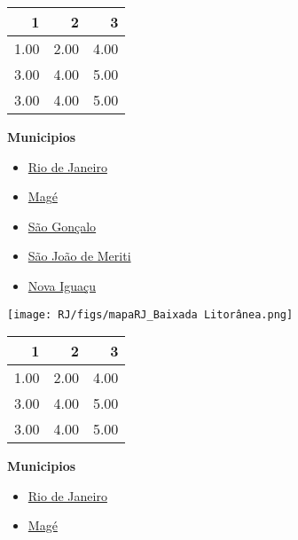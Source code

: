 \documentclass[10pt]{article} %
\begin{document}
\begin{minipage}[t]{.66\linewidth}
\begin{center}
\begin{tabular}{rrr}
  \hline
1 & 2 & 3 \\ 
  \hline
1.00 & 2.00 & 4.00 \\ 
  3.00 & 4.00 & 5.00 \\ 
  3.00 & 4.00 & 5.00 \\ 
   \hline
\end{tabular}
\end{center}
\end{minipage}\hfill\begin{minipage}[t]{.30\linewidth}
\begin{mdframed}[style=sidebar,frametitle={}]
\textbf{Municipios}\begin{itemize}\item \hyperlink{Rio}{Rio de Janeiro}
\item \hyperlink{Mag}{Magé}
\item \hyperlink{SGoncalo}{São Gonçalo}
\item \hyperlink{SJMeriti}{São João de Meriti}
\item \hyperlink{Niguacu}{Nova Iguaçu}
\end{itemize}\end{mdframed}\hfill\end{minipage}\newpage\begin{minipage}[t]{.66\linewidth}
\hypertarget{BaixLit}{}
\texttt{[image: RJ/figs/mapaRJ\_Baixada Litorânea.png]}\vspace{0.5cm}\begin{center}
\begin{tabular}{rrr}
  \hline
1 & 2 & 3 \\ 
  \hline
1.00 & 2.00 & 4.00 \\ 
  3.00 & 4.00 & 5.00 \\ 
  3.00 & 4.00 & 5.00 \\ 
   \hline
\end{tabular}
\end{center}
\end{minipage}\hfill\begin{minipage}[t]{.30\linewidth}
\begin{mdframed}[style=sidebar,frametitle={}]
\textbf{Municipios}\begin{itemize}\item \hyperlink{Rio}{Rio de Janeiro}
\item \hyperlink{Mag}{Magé}

\end{itemize}
\end{mdframed}
\end{minipage}
\end{document}
